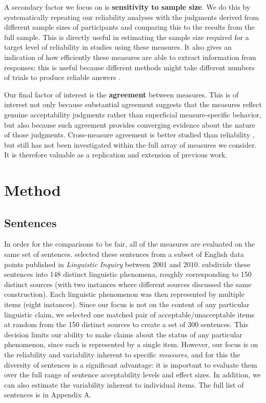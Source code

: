 \documentclass[doc]{apa6}
\begin{document}
A secondary factor we focus on is {\bf sensitivity to sample size}. We do this by systematically repeating our reliability analyses with the judgments derived from different sample sizes of participants and comparing this to the results from the full sample. This is directly useful in estimating the sample size required for a target level of reliability in studies using these measures. It also gives an indication of how efficiently these measures are able to extract information from responses; this is useful because different methods might take different numbers of trials to produce reliable answers \citep{li2016facespairsortriplets,sprousealmeida2017sensitivitypower}.

Our final factor of interest is the {\bf agreement} between measures. This is of interest not only because substantial agreement suggests that the measures reflect genuine acceptability judgments rather than superficial measure-specific behavior, but also because such agreement provides converging evidence about the nature of those judgments. Cross-measure agreement is better studied than reliability \citep{weskott2011informativity,schutze2011linguisticevidence,sprouse2012revisitingadgerscoresyntax}, but still has not been investigated within the full array of measures we consider. It is therefore valuable as a replication and extension of previous work.

\section{Method}

\subsection{Sentences}

In order for the comparisons to be fair, all of the measures are evaluated on the same set of sentences. \citet{sprouse2013formalinformal} %
selected these sentences from a subset of English data points published in {\it Linguistic Inquiry} between 2001 and 2010. \citet{sprouse2013formalinformal}
subdivide these sentences into 148 distinct linguistic phenomena, roughly corresponding to 150 distinct sources (with two instances where different sources discussed the same construction). Each linguistic phenomenon was then represented by multiple items (eight instances). Since our focus is not on the content of any particular linguistic claim, we selected one matched pair of acceptable/unacceptable items at random from the 150 distinct sources to create a set of 300 sentences. This decision limits our ability to make claims about the status of any particular phenomenon, since each is represented by a single item. However, our focus is on the reliability and variability inherent to specific {\it measures}, and for this the diversity of sentences is a significant advantage: it is important to evaluate them over the full range of sentence acceptability levels and effect sizes.
In addition, we can also estimate the variability inherent to individual items.
The full list of sentences is in Appendix A.
\end{document}
